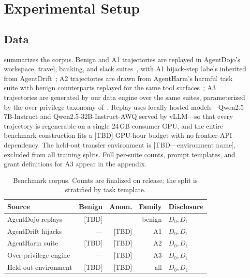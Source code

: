 \section{Experimental Setup}
\label{sec:setup}

\subsection{Data}
\label{sec:setup-data}

 summarizes the corpus. Benign and A1 trajectories are replayed in AgentDojo's workspace, travel, banking, and slack suites~\cite{debenedetti2024agentdojo}, with A1 hijack-step labels inherited from AgentDrift~\cite{pinjari2026agentdrift}; A2 trajectories are drawn from AgentHarm's harmful task suite with benign counterparts replayed for the same tool surfaces~\cite{andriushchenko2024agentharm}; A3 trajectories are generated by our data engine over the same suites, parameterized by the over-privilege taxonomy of~\cite{yang2026when}. Replay uses locally hosted models---Qwen2.5-7B-Instruct and Qwen2.5-32B-Instruct-AWQ served by vLLM---so that every trajectory is regenerable on a single 24\,GB consumer GPU, and the entire benchmark construction fits a [TBD] GPU-hour budget with no frontier-API dependency. The held-out transfer environment is [TBD---environment name], excluded from all training splits. Full per-suite counts, prompt templates, and grant definitions for A3 appear in the appendix.

\begin{table}[tb]
  \centering
  \caption{Benchmark corpus. Counts are finalized on release; the split is stratified by task template.}
  \label{tab:data}
  \begin{small}
  \begin{tabular}{lrrrl}
    \toprule
    \textbf{Source} & \textbf{Benign} & \textbf{Anom.} & \textbf{Family} & \textbf{Disclosure} \\
    \midrule
    AgentDojo replays & [TBD] & --- & benign & $D_0, D_1$ \\
    AgentDrift hijacks & --- & [TBD] & A1 & $D_0, D_1$ \\
    AgentHarm suite & [TBD] & [TBD] & A2 & $D_0, D_1$ \\
    Over-privilege engine & --- & [TBD] & A3 & $D_0, D_1$ \\
    Held-out environment & [TBD] & [TBD] & all & $D_0, D_1$ \\
    \bottomrule
  \end{tabular}
  \end{small}
\end{table}

